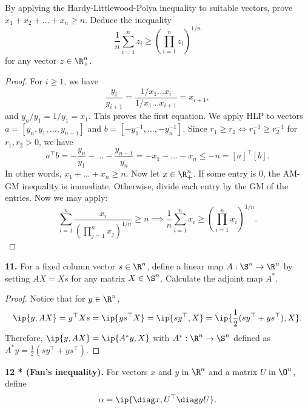 \documentclass[../borwein-lewis_notes.tex]{subfiles}
\begin{document}
By applying the Hardy-Littlewood-Polya inequality to suitable vectors,
prove $x_1+x_2+\ldots + x_n\geq n$. Deduce the inequality 
\begin{equation*}
\frac{1}{n}\sum_{i=1}^n z_i \geq \left(\prod_{i=1}^n z_i\right)^{1/n}
\end{equation*}
for any vector $z\in\R_+^n$.
\begin{proof}
For $i\geq 1$, we have 
\begin{equation*}
\frac{y_i}{y_{i+1}} = \frac{1/x_1\ldots x_i}{1/x_1\ldots x_{i+1}} = 
x_{i+1},
\end{equation*}
and $y_n/y_1 = 1/y_1=x_1$. This proves the first equation. We 
apply HLP to vectors $a=[y_n, y_1,\ldots, y_{n-1}]$ and 
$b=[-y_1^{-1},\ldots, -y_n^{-1}]$. Since $r_1 \geq r_2\iff r_1^{-1}
\geq r_2^{-1}$ for $r_1,r_2>0$, we have 
\begin{equation*}
a^\top b = -\frac{y_n}{y_1} - \ldots - \frac{y_{n-1}}{y_n} = 
-x_1-\ldots - x_n \leq -n = [a]^\top[b].
\end{equation*}
In other words, $x_1+\ldots + x_n \geq n$. Now let $x\in \R_{+}^n$.
If some entry is 0, the AM-GM inequality is immediate. Otherwise,
divide each entry by the GM of the entries. Now we may apply:
\begin{equation*}
\sum_{i=1}^n \frac{x_i}{(\prod_{j=1}^n x_j)^{1/n}} \geq n 
\implies \frac{1}{n}\sum_{i=1}^n x_i \geq \left(\prod_{i=1}^n x_i\right)^{
1/n}.
\end{equation*}
\end{proof}\noindent
\textbf{11.} For a fixed column vector $s\in\R^n$, define a linear map 
$A:\S^n\to\R^n$ by setting $AX=Xs$ for any matrix $X\in\S^n$. Calculate 
the adjoint map $A^*$.
\begin{proof}
Notice that for $y\in\R^n$, 
\begin{equation*}
\ip{y, AX} = y^\top Xs = \ip{ys^\top X}= \ip{sy^\top, X}
= \ip{\frac{1}{2}(sy^\top + ys^\top), X}.
\end{equation*}
Therefore, $\ip{y, AX} = \ip{A^*y, X}$ with $A^*:\R^n\to\S^n$ defined 
as $A^*y = \frac{1}{2}(sy^\top + ys^\top)$. 
\end{proof}\noindent
\textbf{12 * (Fan's inequality).} For vectors $x$ and $y$ in $\R^n$ and 
a matrix $U$ in $\O^n$, define 
\begin{equation*}
\alpha = \ip{\diag x, U^\top \diag y U}.
\end{equation*}
\end{document}
